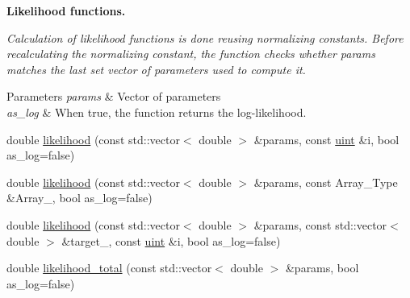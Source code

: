 \begin{Indent}\textbf{ Likelihood functions.}\par
{\em Calculation of likelihood functions is done reusing normalizing constants. Before recalculating the normalizing constant, the function checks whether {\ttfamily params} matches the last set vector of parameters used to compute it.


\begin{DoxyParams}{Parameters}
{\em params} & Vector of parameters \\
\hline
{\em as\+\_\+log} & When {\ttfamily true}, the function returns the log-\/likelihood. \\
\hline
\end{DoxyParams}
}\begin{DoxyCompactItemize}
\item 
double \hyperlink{classbarry_1_1_model_ae75fe2213980b6b245e279c7836ab99b}{likelihood} (const std\+::vector$<$ double $>$ \&params, const \hyperlink{namespacebarry_a11dfc53ddb4672278319aa04f1e09a6c}{uint} \&i, bool as\+\_\+log=false)
\item 
double \hyperlink{classbarry_1_1_model_a1a11a54860e22fbd152de4d7cfd30b89}{likelihood} (const std\+::vector$<$ double $>$ \&params, const Array\+\_\+\+Type \&Array\+\_\+, bool as\+\_\+log=false)
\item 
double \hyperlink{classbarry_1_1_model_ab88f541fc010f0ee1a415c9cb6c292b7}{likelihood} (const std\+::vector$<$ double $>$ \&params, const std\+::vector$<$ double $>$ \&target\+\_\+, const \hyperlink{namespacebarry_a11dfc53ddb4672278319aa04f1e09a6c}{uint} \&i, bool as\+\_\+log=false)
\item 
double \hyperlink{classbarry_1_1_model_a31d16ef478d772cedde0813575074a0f}{likelihood\+\_\+total} (const std\+::vector$<$ double $>$ \&params, bool as\+\_\+log=false)
\end{DoxyCompactItemize}
\end{Indent}
